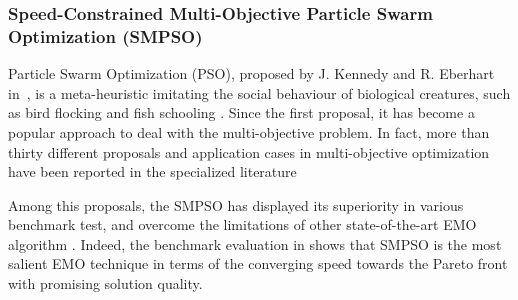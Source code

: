 \documentclass[10pt,journal,compsoc]{IEEEtran}
\begin{document}



\subsubsection{Speed-Constrained Multi-Objective Particle Swarm Optimization (SMPSO)}
Particle Swarm Optimization (PSO), proposed by J. Kennedy and R. Eberhart in~\cite{poli2017}, is a meta-heuristic imitating the social behaviour of biological creatures, such as bird flocking and fish schooling \cite{poli2017}. Since the first proposal, it has become a popular approach to deal with the multi-objective problem. In fact, more than thirty different proposals and application cases in multi-objective optimization have been reported in the specialized literature \cite{reyes2006multi}

Among this proposals, the SMPSO has displayed its superiority in various benchmark test, and overcome the limitations of other state-of-the-art EMO algorithm \cite{kachroudi2010average, atashpendar2016parallel}. Indeed, the benchmark evaluation in \cite{smpso} shows that SMPSO is the most salient EMO technique in terms of the converging speed towards the Pareto front with promising solution quality\cite{smpso}.
\end{document}
